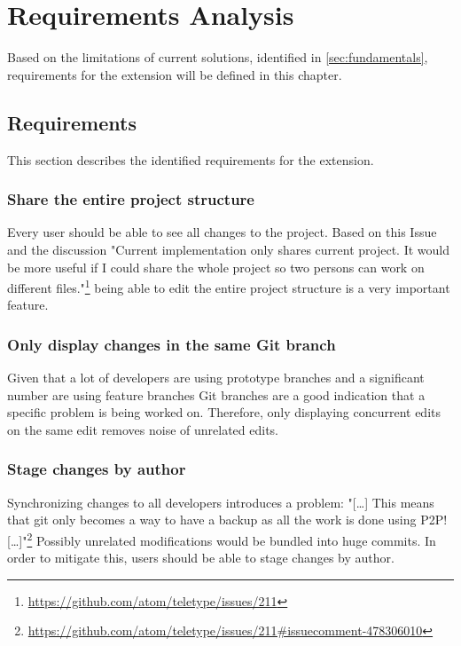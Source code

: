 \chapter{Requirements Analysis}

Based on the limitations of current solutions, identified in \autoref{sec:fundamentals}, requirements for the extension will be defined in this chapter.

\section{Requirements}

This section describes the identified requirements for the extension.

\subsection{Share the entire project structure}

Every user should be able to see all changes to the project.
Based on this Issue and the discussion "Current implementation only shares current project. It would be more useful if I could share the whole project so two persons can work on different files."\footnote{\href{https://github.com/atom/teletype/issues/211}{https://github.com/atom/teletype/issues/211}} being able to edit the entire project structure is a very important feature.

\subsection{Only display changes in the same Git branch}

Given that a lot of developers are using prototype branches and a significant number are using feature branches Git branches are a good indication that a specific problem is being worked on.\cite{PhillipsSillitoWalker:2011:Branching_and_merging} Therefore, only displaying concurrent edits on the same edit removes noise of unrelated edits.

\subsection{Stage changes by author}

Synchronizing changes to all developers introduces a problem:
"[\dots] This means that git only becomes a way to have a backup as all the work is done using P2P! [\dots]"\footnote{\href{https://github.com/atom/teletype/issues/211\#issuecomment-478306010}{https://github.com/atom/teletype/issues/211\#issuecomment-478306010}}
Possibly unrelated modifications would be bundled into huge commits. In order to mitigate this, users should be able to stage changes by author.

